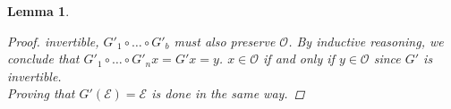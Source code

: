 \documentclass[]{article}
\newtheorem{lem}{Lemma}[section]
\begin{document}
\begin{lem}
\begin{proof}
invertible, $G'_1\circ\dots\circ G'_{b}$ must also preserve $\mathcal{O}$. By inductive reasoning, we conclude that  $G'_1\circ\dots\circ G'_n x = G' x = y$. $x\in\mathcal{O}$ if and only if $y\in\mathcal{O}$ since $G'$ is invertible.\\
Proving that $G'(\mathcal{E})=\mathcal{E}$ is done in the same way.
\end{proof}
\end{lem}
\end{document}
